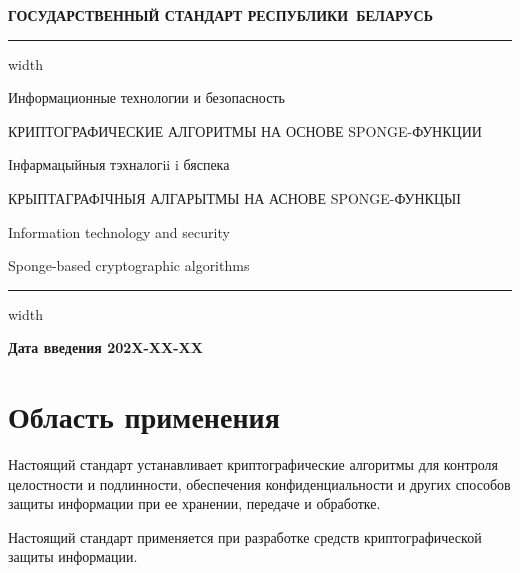 \newpage
\setcounter{page}{1}
\pagestyle{headings}

\begin{center}
{\bfseries
ГОСУДАРСТВЕННЫЙ СТАНДАРТ РЕСПУБЛИКИ~БЕЛАРУСЬ
\vskip 2pt
\hrule width\textwidth

\vskip 9pt

Информационные технологии и безопасность

КРИПТОГРАФИЧЕСКИЕ АЛГОРИТМЫ НА ОСНОВЕ SPONGE-ФУНКЦИИ

\vskip 9pt

Iнфармацыйныя тэхналогii i бяспека

КРЫПТАГРАФIЧНЫЯ АЛГАРЫТМЫ НА АСНОВЕ SPONGE-ФУНКЦЫІ
} %

\vskip 9pt

Information technology and security

Sponge-based cryptographic algorithms

\vskip 4pt                
\hrule width \textwidth
\end{center}

\mbox{}\hfill{\bfseries Дата введения 202X-XX-XX}

\chapter{Область применения}

Настоящий стандарт устанавливает криптографические алгоритмы  для контроля целостности и подлинности, обеспечения 
конфиденциальности и других способов защиты информации при ее хранении, 
передаче и обработке.

Настоящий стандарт применяется при разработке 
средств криптографической защиты информации.

